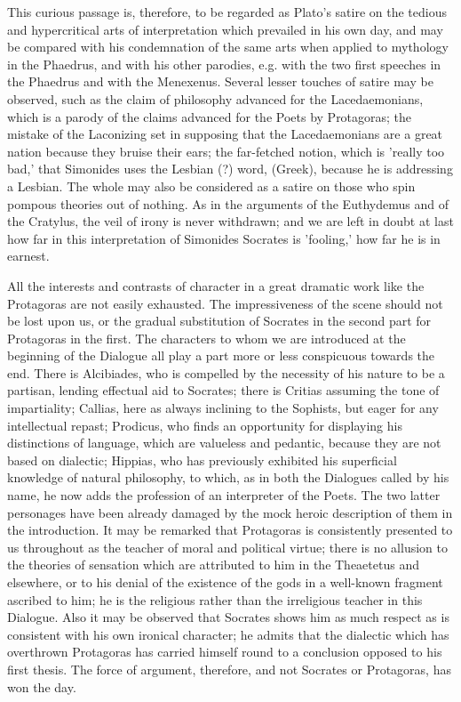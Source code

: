 \documentclass[11pt,letter]{article}
\begin{document}
\par  This curious passage is, therefore, to be regarded as Plato's satire on the tedious and hypercritical arts of interpretation which prevailed in his own day, and may be compared with his condemnation of the same arts when applied to mythology in the Phaedrus, and with his other parodies, e.g. with the two first speeches in the Phaedrus and with the Menexenus. Several lesser touches of satire may be observed, such as the claim of philosophy advanced for the Lacedaemonians, which is a parody of the claims advanced for the Poets by Protagoras; the mistake of the Laconizing set in supposing that the Lacedaemonians are a great nation because they bruise their ears; the far-fetched notion, which is 'really too bad,' that Simonides uses the Lesbian (?) word, (Greek), because he is addressing a Lesbian. The whole may also be considered as a satire on those who spin pompous theories out of nothing. As in the arguments of the Euthydemus and of the Cratylus, the veil of irony is never withdrawn; and we are left in doubt at last how far in this interpretation of Simonides Socrates is 'fooling,' how far he is in earnest.

\par  All the interests and contrasts of character in a great dramatic work like the Protagoras are not easily exhausted. The impressiveness of the scene should not be lost upon us, or the gradual substitution of Socrates in the second part for Protagoras in the first. The characters to whom we are introduced at the beginning of the Dialogue all play a part more or less conspicuous towards the end. There is Alcibiades, who is compelled by the necessity of his nature to be a partisan, lending effectual aid to Socrates; there is Critias assuming the tone of impartiality; Callias, here as always inclining to the Sophists, but eager for any intellectual repast; Prodicus, who finds an opportunity for displaying his distinctions of language, which are valueless and pedantic, because they are not based on dialectic; Hippias, who has previously exhibited his superficial knowledge of natural philosophy, to which, as in both the Dialogues called by his name, he now adds the profession of an interpreter of the Poets. The two latter personages have been already damaged by the mock heroic description of them in the introduction. It may be remarked that Protagoras is consistently presented to us throughout as the teacher of moral and political virtue; there is no allusion to the theories of sensation which are attributed to him in the Theaetetus and elsewhere, or to his denial of the existence of the gods in a well-known fragment ascribed to him; he is the religious rather than the irreligious teacher in this Dialogue. Also it may be observed that Socrates shows him as much respect as is consistent with his own ironical character; he admits that the dialectic which has overthrown Protagoras has carried himself round to a conclusion opposed to his first thesis. The force of argument, therefore, and not Socrates or Protagoras, has won the day.
\end{document}
